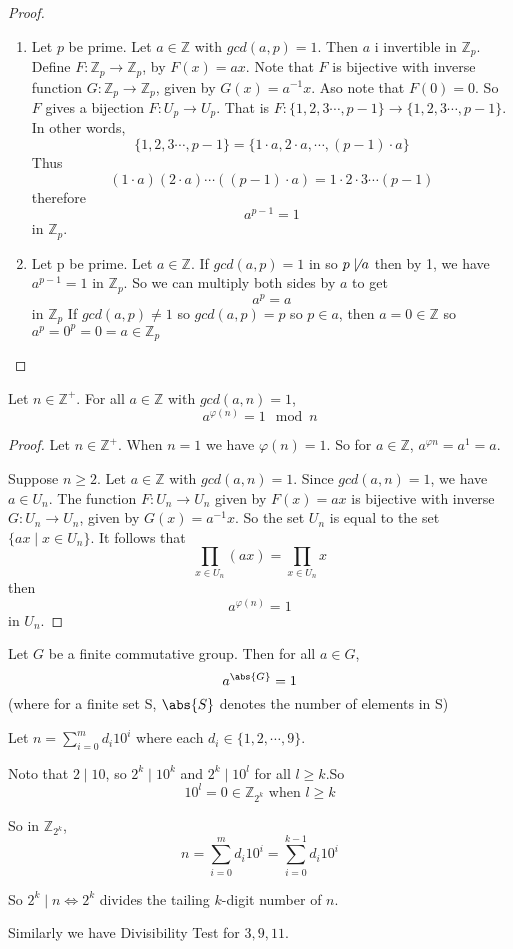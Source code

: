 \begin{proof}
\begin{enumerate}
    \item Let $p$ be prime. Let $a\in\mathbb{Z}$ with $gcd(a,p) = 1$. Then $a$ i invertible in $\mathbb{Z}_p$. Define $F\colon \mathbb{Z}_p\to \mathbb{Z}_p$, by $F(x) = ax$. Note that $F$ is bijective with inverse function $G\colon\mathbb{Z}_p\to \mathbb{Z}_p$, given by $G(x) = a^{-1}x$. Aso note that $F(0) = 0$. So $F$ gives a bijection $F\colon U_p\to U_p$. That is $F\colon \{1,2,3\cdots, p-1\}\to \{1,2,3\cdots, p-1\}$. In other words, \[\{1,2,3\cdots, p-1\} = \{1\cdot a, 2\cdot a,\cdots ,(p-1)\cdot a\}\] Thus \[(1\cdot a)(2\cdot a)\cdots ((p-1)\cdot a) = 1\cdot 2\cdot 3\cdots (p-1)\] therefore \[a^{p-1} = 1\] in $\mathbb{Z}_p$.

    \item Let p be prime. Let $a\in\mathbb{Z}$. If $gcd(a, p) = 1$ in so $p\not\mid a$ then by 1, we have $a^{p-1} = 1$ in $\mathbb{Z}_p$. So we can multiply both sides by $a$ to get \[a^p = a\] in $\mathbb{Z}_p$ If $gcd(a,p)\neq 1$ so $gcd(a,p)=p$ so $p\in a$, then $a = 0 \in \mathbb{Z}$ so $a^p = 0^p = 0 = a \in \mathbb{Z}_p$
\end{enumerate}
\end{proof}

\begin{thm}
Let $n \in \mathbb{Z}^+$. For all $a\in\mathbb{Z}$ with $gcd(a,n) = 1$, \[a^{\varphi (n)} = 1 \mod n\]
\end{thm}
\begin{proof}
Let $n\in\mathbb{Z}^+$. When $n=1$ we have $\varphi (n) = 1$. So for $a\in \mathbb{Z}$, $a^{\varphi{n}} = a^{1} = a$.

Suppose $n\geq 2$. Let $a\in\mathbb{Z}$ with $gcd(a,n) = 1$. Since $gcd(a,n) = 1$, we have $a\in U_n$. The function $F\colon U_n\to U_n$ given by $F(x) = ax$ is bijective with inverse $G\colon U_n\to U_n$, given by $G(x) = a^{-1}x$. So the set $U_n$ is equal to the set $\{ax \mid x\in U_n\}$. It follows that \[\prod_{x\in U_n} (ax) = \prod_{x\in U_n} x\] then \[a^{\varphi(n)}=1\] in $U_n$.
\end{proof}

\begin{thm}
Let $G$ be a finite commutative group. Then for all $a\in G$, \[a^{\abs{G}} = 1\] (where for a finite set S, $\abs{S}$ denotes the number of elements in S)
\end{thm}



Let $n = \sum_{i=0}^m d_i 10^i$ where each $d_i\in\{1,2,\cdots , 9\}$.

Noto that $2 \mid 10$, so $2^k\mid 10^k$ and $2^k \mid 10^l$ for all $l\geq k$.So \[10^l = 0 \in \mathbb{Z}_{2^k} \text{ when } l\geq k\]

So in $\mathbb{Z}_{2^k}$,
\[n = \sum_{i=0}^m d_i 10^i = \sum_{i = 0}^{k-1} d_i 10^i\]

So $2^k \mid n \Longleftrightarrow 2^k$ divides the tailing $k$-digit number of $n$.


Similarly we have Divisibility Test for $3,9,11$.
